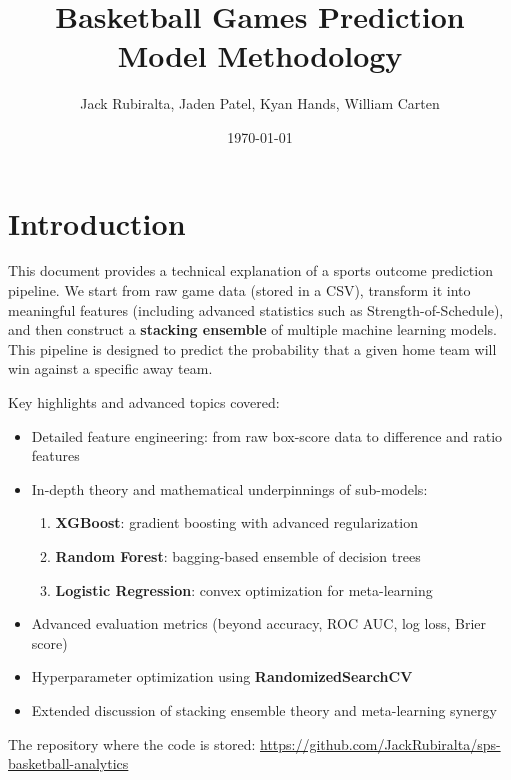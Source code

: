 \documentclass[12pt]{article}
\title{Basketball Games Prediction Model Methodology}
\author{Jack Rubiralta, Jaden Patel, Kyan Hands, William Carten}
\date{\today}
\begin{document}
\maketitle
\pagebreak

\section{Introduction}
This document provides a technical explanation of a sports outcome prediction pipeline. We start from raw game data (stored in a CSV), transform it into meaningful features (including advanced statistics such as Strength-of-Schedule), and then construct a \textbf{stacking ensemble} of multiple machine learning models. This pipeline is designed to predict the probability that a given home team will win against a specific away team.

Key highlights and advanced topics covered:
\begin{itemize}[noitemsep]
    \item Detailed feature engineering: from raw box-score data to difference and ratio features
    \item In-depth theory and mathematical underpinnings of sub-models:
    \begin{enumerate}[label=\arabic*)]
        \item \textbf{XGBoost}: gradient boosting with advanced regularization
        \item \textbf{Random Forest}: bagging-based ensemble of decision trees
        \item \textbf{Logistic Regression}: convex optimization for meta-learning
    \end{enumerate}
    \item Advanced evaluation metrics (beyond accuracy, ROC AUC, log loss, Brier score)
    \item Hyperparameter optimization using \textbf{RandomizedSearchCV}
    \item Extended discussion of stacking ensemble theory and meta-learning synergy
\end{itemize}
\noindent
The repository where the code is stored: \url{https://github.com/JackRubiralta/sps-basketball-analytics}

\end{document}
